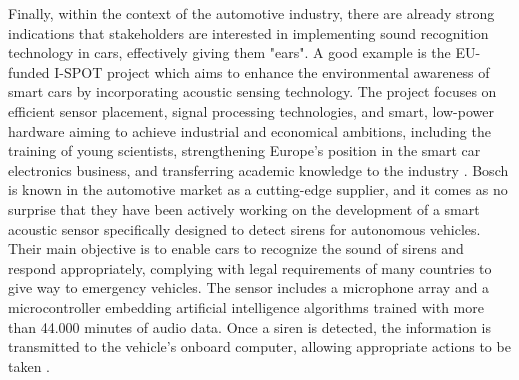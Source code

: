 Finally, within the context of the automotive industry, there are already strong indications that stakeholders are interested in implementing sound recognition technology in cars, effectively giving them "ears". A good example is the EU-funded I-SPOT project which aims to enhance the environmental awareness of smart cars by incorporating acoustic sensing technology. The project focuses on efficient sensor placement, signal processing technologies, and smart, low-power hardware aiming to achieve industrial and economical ambitions, including the training of young scientists, strengthening Europe's position in the smart car electronics business, and transferring academic knowledge to the industry \cite{ISPOT2020}. Bosch is known in the automotive market as a cutting-edge supplier, and it comes as no surprise that they have been actively working on the development of a smart acoustic sensor specifically designed to detect sirens for autonomous vehicles. Their main objective is to enable cars to recognize the sound of sirens and respond appropriately, complying with legal requirements of many countries to give way to emergency vehicles. The sensor includes a microphone array and a microcontroller embedding artificial intelligence algorithms trained with more than 44.000 minutes of audio data. Once a siren is detected, the information is transmitted to the vehicle's onboard computer, allowing appropriate actions to be taken \cite{BOSCH2024}.

